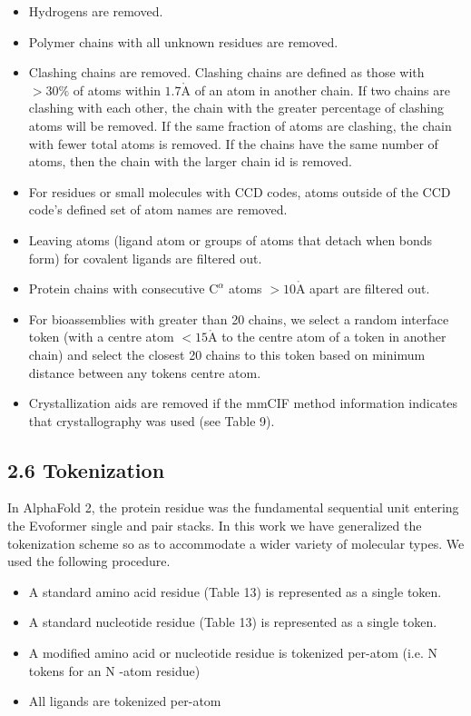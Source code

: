 \documentclass[10pt]{article}
\def\AA{\mathring{\mathrm{A}}}
\begin{document}
\begin{itemize}
  \item Hydrogens are removed.
  \item Polymer chains with all unknown residues are removed.
  \item Clashing chains are removed. Clashing chains are defined as those with $>30 \%$ of atoms within $1.7 \AA$ of an atom in another chain. If two chains are clashing with each other, the chain with the greater percentage of clashing atoms will be removed. If the same fraction of atoms are clashing, the chain with fewer total atoms is removed. If the chains have the same number of atoms, then the chain with the larger chain id is removed.
  \item For residues or small molecules with CCD codes, atoms outside of the CCD code's defined set of atom names are removed.
  \item Leaving atoms (ligand atom or groups of atoms that detach when bonds form) for covalent ligands are filtered out.
  \item Protein chains with consecutive $\mathrm{C}^{\alpha}$ atoms $>10 \AA$ apart are filtered out.
  \item For bioassemblies with greater than 20 chains, we select a random interface token (with a centre atom $<15 \AA$ to the centre atom of a token in another chain) and select the closest 20 chains to this token based on minimum distance between any tokens centre atom.
  \item Crystallization aids are removed if the mmCIF method information indicates that crystallography was used (see Table 9).
\end{itemize}

\subsection*{2.6 Tokenization}
In AlphaFold 2, the protein residue was the fundamental sequential unit entering the Evoformer single and pair stacks. In this work we have generalized the tokenization scheme so as to accommodate a wider variety of molecular types. We used the following procedure.

\begin{itemize}
  \item A standard amino acid residue (Table 13) is represented as a single token.
  \item A standard nucleotide residue (Table 13) is represented as a single token.
  \item A modified amino acid or nucleotide residue is tokenized per-atom (i.e. N tokens for an N -atom residue)
  \item All ligands are tokenized per-atom
\end{itemize}
\end{document}
